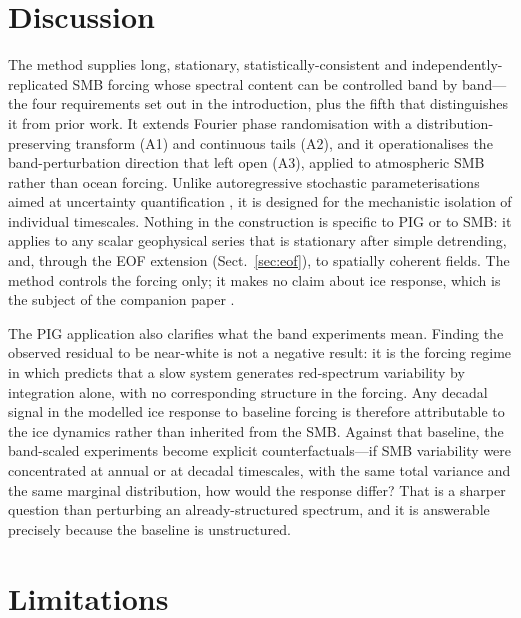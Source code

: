 \section{Discussion}\label{sec:discussion}

The method supplies long, stationary, statistically-consistent and
independently-replicated SMB forcing whose spectral content can be
controlled band by band---the four requirements set out in the
introduction, plus the fifth that distinguishes it from prior work. It
extends Fourier phase randomisation \citep{theiler1992,schreiber2000} with a
distribution-preserving transform (A1) and continuous tails (A2), and it
operationalises the band-perturbation direction that \citet{muruganandham2023}
left open (A3), applied to atmospheric SMB rather than ocean forcing. Unlike
autoregressive stochastic parameterisations aimed at uncertainty
quantification \citep{ultee2024,verjans2023}, it is designed for the
mechanistic isolation of individual timescales. Nothing in the construction
is specific to PIG or to SMB: it applies to any scalar geophysical series
that is stationary after simple detrending, and, through the EOF extension
(Sect.~\ref{sec:eof}), to spatially coherent fields. The method controls the
forcing only; it makes no claim about ice response, which is the subject of
the companion paper \citep{markovsky_inprep}.

The PIG application also clarifies what the band experiments mean. Finding
the observed residual to be near-white is not a negative result: it is the
forcing regime in which \citet{hasselmann1976} predicts that a slow system
generates red-spectrum variability by integration alone, with no
corresponding structure in the forcing. Any decadal signal in the modelled
ice response to baseline forcing is therefore attributable to the ice
dynamics rather than inherited from the SMB. Against that baseline, the
band-scaled experiments become explicit counterfactuals---if SMB variability
were concentrated at annual or at decadal timescales, with the same total
variance and the same marginal distribution, how would the response differ?
That is a sharper question than perturbing an already-structured spectrum,
and it is answerable precisely because the baseline is unstructured.


\section{Limitations}\label{sec:limitations}

